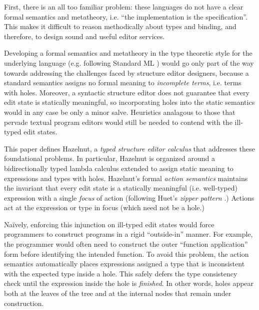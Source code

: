 First, there is an all too familiar problem: these languages do not have a clear formal semantics and metatheory, i.e. ``the implementation is the specification''. This makes it difficult to reason methodically about types and binding, and therefore, to design sound and useful editor services.

Developing a formal semantics and metatheory in the type theoretic style for the underlying language (e.g. following Standard ML \cite{Harper00atype-theoretic,mthm97-for-dart}) would go only part of the way towards addressing the challenges faced by structure editor designers, because a standard semantics assigns no formal meaning to \emph{incomplete terms}, i.e. terms with holes. Moreover, a syntactic structure editor does not guarantee that every edit state is statically meaningful, so incorporating holes into the static semantics would in any case be only a minor salve. Heuristics analagous to those that pervade textual program editors would still be needed to contend with the ill-typed edit states.

This paper defines Hazelnut,  a \emph{typed structure editor calculus} that addresses these foundational problems. 
In particular, Hazelnut is organized around a bidirectionally typed lambda calculus extended to assign static meaning to expressions and types with {holes}. Hazelnut's formal \emph{action semantics} maintains the invariant that every edit state is a statically meaningful (i.e. well-typed) expression with a single \emph{focus} of action (following Huet's \emph{zipper pattern} \cite{JFP::Huet1997}.) Actions act at the expression or type in focus (which need not be a hole.)  %

Na\"ively, enforcing this injunction on ill-typed edit states would force programmers to construct programs in a rigid ``outside-in'' manner. For example, the programmer would often need to construct the outer ``function application'' form before identifying the intended function. To avoid this problem, the action semantics automatically places expressions assigned a type that is inconsistent with the expected type inside a {hole}. This safely defers the type consistency check until the expression inside the hole is \emph{finished}. In other words, holes appear both at the leaves of the tree and at the internal nodes that remain under construction. %

